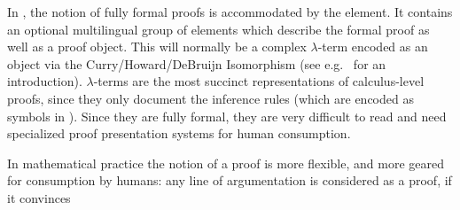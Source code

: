In {\omdoc}, the notion of fully formal proofs is accommodated by the
{} element. It contains an optional multilingual group of
{} elements which describe the formal proof as well as a proof
object.  This will normally be a complex $\lambda$-term encoded as an {\openmath}
object via the Curry/Howard/DeBruijn Isomorphism (see e.g.~\cite{Thompson91} for
an introduction). $\lambda$-terms are the most succinct representations of
calculus-level proofs, since they only document the inference rules (which are
encoded as {\openmath} symbols in {\omdoc}). Since they are fully formal, they are
very difficult to read and need specialized proof presentation systems for human
consumption.
In mathematical practice the notion of a proof is more flexible, and more geared for
consumption by humans: any line of argumentation is considered as a proof, if it convinces
